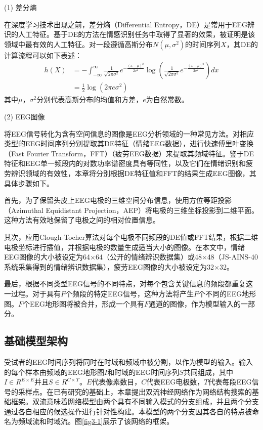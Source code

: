 (1) 差分熵

在深度学习技术出现之前，差分熵（Differential Entropy，DE）是常用于EEG辨识的人工特征\cite{3-2}。基于DE的方法在情感识别任务中取得了显著的效果，被证明是该领域中最有效的人工特征。对一段遵循高斯分布$N\left(\mu, \sigma^2\right)$的时间序列$X$，其DE的计算流程可以如下表述：
\vspace{3mm}
\begin{equation}
\begin{split}
    \label{deqn_ex3_1}
	h(X) &= -\int_{-\infty}^{\infty} \frac{1}{\sqrt{2 \pi \sigma^2}} e^{-\frac{(x-\mu)^2}{2 \sigma^2}} \log \left(\frac{1}{\sqrt{2 \pi \sigma^2}} e^{-\frac{(x-\mu)^2}{2 \sigma^2}}\right) d x\\
    &= \frac{1}{2} \log \left(2 \pi e \sigma^2\right)
\end{split}
\end{equation}
其中$\mu$，$\sigma^2$分别代表高斯分布的均值和方差，$e$为自然常数。

(2) EEG图像

将EEG信号转化为含有空间信息的图像是EEG分析领域的一种常见方法\cite{3-3}。对相应类型的EEG时间序列分别提取其DE特征（情绪EEG数据），进行快速傅里叶变换（Fast Fourier Transform，FFT）（疲劳EEG数据）来提取其频域特征。鉴于DE特征和EEG单一频段内的对数功率谱密度具有等同性\cite{3-10}，以及它们在情绪识别和疲劳辨识领域的有效性\cite{3-2,3-30}，本章将分别根据DE特征值和FFT的结果生成EEG图像，其具体步骤如下。

首先，为了保留头皮上EEG电极的三维空间分布信息，使用方位等距投影（Azimuthal Equidistant Projection，AEP）\cite{3-4}将电极的三维坐标投影到二维平面。这种方法有效地保留了电极之间的相对位置信息。

其次，应用Clough-Tocher算法\cite{3-5}对每个电极不同频段的DE值或FFT结果，根据二维电极坐标进行插值，并根据电极的数量生成适当大小的图像。在本文中，情绪EEG图像的大小被设定为64×64（公开的情绪辨识数据集）或48×48（JS-AINS-40系统采集得到的情绪辨识数据集），疲劳EEG图像的大小被设定为32×32。

最后，根据不同类型EEG信号的不同特点，对每个包含关键信息的频段都重复这一过程。对于具有$F$个频段的特定EEG信号，这种方法将产生$F$个不同的EEG地形图。$F$个EEG地形图将被合并，形成一个具有$F$通道的图像，作为模型输入的一部分。

\subsection{基础模型架构}
受试者的EEG时间序列将同时在时域和频域中被分割，以作为模型的输入。输入的每个样本由频域的EEG地形图$I$和时域的EEG时间序列$S$共同组成，其中$I \in R^{E \times E}$并且$S \in R^{C \times T}$。$E$代表像素数目，$C$代表EEG电极数，$T$代表每段EEG信号的采样点。在已有研究的基础上\cite{3-6}，本章提出双流神经网络作为网络结构搜索的基础框架。双流意味着网络模型由两个具有不同输入模式的分支组成，并且两个分支通过各自相应的候选操作进行针对性构建。本模型的两个分支因其各自的特点被命名为频域流和时域流。图\ref{fig3-1}展示了该网络的框架。

